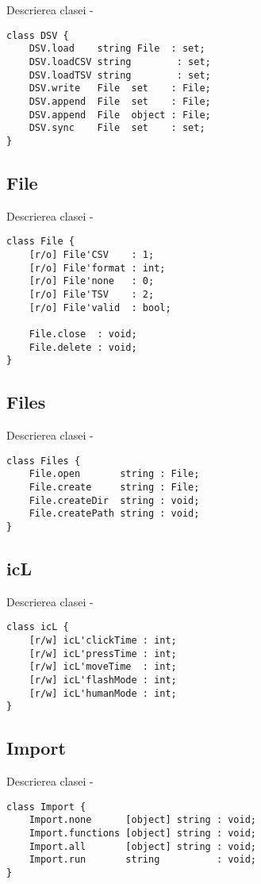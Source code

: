 \noindent Descrierea clasei  -
\begin{lstlisting}[numbers=none]
class DSV {
	DSV.load    string File  : set;
	DSV.loadCSV string        : set;
	DSV.loadTSV string        : set;
	DSV.write   File  set    : File;
	DSV.append  File  set    : File;
	DSV.append  File  object : File;
	DSV.sync    File  set    : set;
}
\end{lstlisting}

\subsection{{\color{orange} File}}

\noindent Descrierea clasei  -
\begin{lstlisting}[numbers=none]
class File {
	[r/o] File'CSV    : 1;
	[r/o] File'format : int;
	[r/o] File'none   : 0;
	[r/o] File'TSV    : 2;
	[r/o] File'valid  : bool;
	
	File.close  : void;
	File.delete : void;
}
\end{lstlisting}

\subsection{{\color{orange} Files}}

\noindent Descrierea clasei  -
\begin{lstlisting}[numbers=none]
class Files {
	File.open       string : File;
	File.create     string : File;
	File.createDir  string : void;
	File.createPath string : void;
}
\end{lstlisting}

\subsection{{\color{orange} icL}}

\noindent Descrierea clasei  -
\begin{lstlisting}[numbers=none]
class icL {
	[r/w] icL'clickTime : int;
	[r/w] icL'pressTime : int;
	[r/w] icL'moveTime  : int;
	[r/w] icL'flashMode : int;
	[r/w] icL'humanMode : int;
}
\end{lstlisting}

\subsection{{\color{orange} Import}}

\noindent Descrierea clasei  -
\begin{lstlisting}[numbers=none]
class Import {
	Import.none      [object] string : void;
	Import.functions [object] string : void;
	Import.all       [object] string : void;
	Import.run       string          : void;
}
\end{lstlisting}

